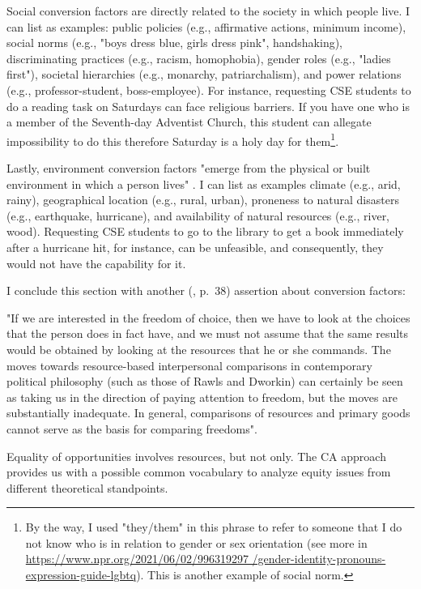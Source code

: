 Social conversion factors are directly related to the society in which people live. I can list as examples: public policies (e.g., affirmative actions, minimum income), social norms (e.g., "boys dress blue, girls dress pink", handshaking), discriminating practices (e.g., racism, homophobia), gender roles (e.g., "ladies first"), societal hierarchies (e.g., monarchy, patriarchalism), and power relations (e.g., professor-student, boss-employee). For instance, requesting \gls{CSE} students to do a reading task on Saturdays can face religious barriers. If you have one who is a member of the Seventh-day Adventist Church, this student can allegate impossibility to do this therefore Saturday is a holy day for them\footnote{By the way, I used "they/them" in this phrase to refer to someone that I do not know who is in relation to gender or sex orientation (see more in \url{https://www.npr.org/2021/06/02/996319297 /gender-identity-pronouns-expression-guide-lgbtq}). This is another example of social norm.}.

Lastly, environment conversion factors "emerge from the physical or built environment in which a person lives" \cite{robeyns:2023}. I can list as examples climate (e.g., arid, rainy), geographical location (e.g., rural, urban), proneness to natural disasters (e.g., earthquake, hurricane), and availability of natural resources (e.g., river, wood). Requesting \gls{CSE} students to go to the library to get a book immediately after a hurricane hit, for instance, can be unfeasible, and consequently, they would not have the capability for it.

I conclude this section with another  (\citeyear{sen:1992}, p.~38) assertion about conversion factors: 
\begin{citacao}
    "If we are interested in the freedom of choice, then we have to look at the choices that the person does in fact have, and we must not assume that the same results would be obtained by looking at the resources that he or she commands. The moves towards resource-based interpersonal comparisons in contemporary political philosophy (such as those of Rawls and Dworkin) can certainly be seen as taking us in the direction of paying attention to freedom, but the moves are substantially inadequate. In general, comparisons of resources and primary goods cannot serve as the basis for comparing freedoms".
\end{citacao}
Equality of opportunities involves resources, but not only. The \gls{CA} approach provides us with a possible common vocabulary to analyze equity issues from different theoretical standpoints. 

